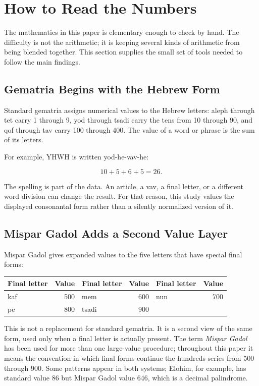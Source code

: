 \section{How to Read the Numbers}

The mathematics in this paper is elementary enough to check by hand. The difficulty is not the arithmetic; it is keeping several kinds of arithmetic from being blended together. This section supplies the small set of tools needed to follow the main findings.

\subsection{Gematria Begins with the Hebrew Form}

Standard gematria assigns numerical values to the Hebrew letters: aleph through tet carry 1 through 9, yod through tsadi carry the tens from 10 through 90, and qof through tav carry 100 through 400. The value of a word or phrase is the sum of its letters.\cite{schechter1906gematria}

For example, YHWH is written yod-he-vav-he:

\[
10+5+6+5=26.
\]

The spelling is part of the data. An article, a vav, a final letter, or a different word division can change the result. For that reason, this study values the displayed consonantal form rather than a silently normalized version of it.

\subsection{Mispar Gadol Adds a Second Value Layer}

Mispar Gadol gives expanded values to the five letters that have special final forms:

\begin{center}
\begin{tabular}{lr@{\qquad}lr@{\qquad}lr}
\toprule
Final letter & Value & Final letter & Value & Final letter & Value \\
\midrule
kaf & 500 & mem & 600 & nun & 700 \\
pe & 800 & tsadi & 900 & & \\
\bottomrule
\end{tabular}
\end{center}

This is not a replacement for standard gematria. It is a second view of the same form, used only when a final letter is actually present. The term \emph{Mispar Gadol} has been used for more than one large-value procedure; throughout this paper it means the convention in which final forms continue the hundreds series from 500 through 900.\cite{schechter1906gematria} Some patterns appear in both systems; Elohim, for example, has standard value 86 but Mispar Gadol value 646, which is a decimal palindrome.

